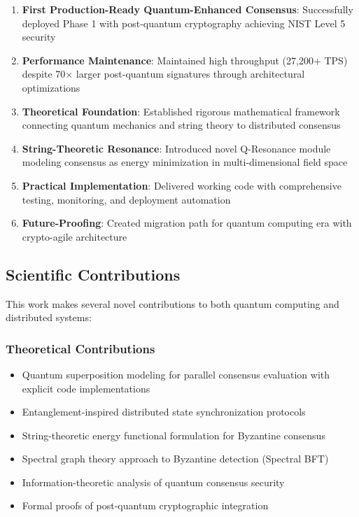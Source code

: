 \documentclass[11pt,a4paper]{article}
\begin{document}
\begin{enumerate}
    \item \textbf{First Production-Ready Quantum-Enhanced Consensus}: Successfully deployed Phase 1 with post-quantum cryptography achieving NIST Level 5 security

    \item \textbf{Performance Maintenance}: Maintained high throughput (27,200+ TPS) despite 70× larger post-quantum signatures through architectural optimizations

    \item \textbf{Theoretical Foundation}: Established rigorous mathematical framework connecting quantum mechanics and string theory to distributed consensus

    \item \textbf{String-Theoretic Resonance}: Introduced novel Q-Resonance module modeling consensus as energy minimization in multi-dimensional field space

    \item \textbf{Practical Implementation}: Delivered working code with comprehensive testing, monitoring, and deployment automation

    \item \textbf{Future-Proofing}: Created migration path for quantum computing era with crypto-agile architecture
\end{enumerate}

\subsection{Scientific Contributions}

This work makes several novel contributions to both quantum computing and distributed systems:

\subsubsection{Theoretical Contributions}
\begin{itemize}
    \item Quantum superposition modeling for parallel consensus evaluation with explicit code implementations
    \item Entanglement-inspired distributed state synchronization protocols
    \item String-theoretic energy functional formulation for Byzantine consensus
    \item Spectral graph theory approach to Byzantine detection (Spectral BFT)
    \item Information-theoretic analysis of quantum consensus security
    \item Formal proofs of post-quantum cryptographic integration
\end{itemize}
\end{document}
